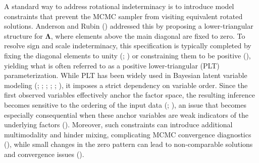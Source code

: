 \documentclass[
  man,
  longtable,
  nolmodern,
  notxfonts,
  notimes,
  colorlinks=true,linkcolor=blue,citecolor=blue,urlcolor=blue]{apa7}
\theoremstyle{plain}
\theoremstyle{plain}
\theoremstyle{remark}
\begin{document}
A standard way to address rotational indeterminacy is to introduce model
constraints that prevent the MCMC sampler from visiting equivalent
rotated solutions. Anderson and Rubin
() addressed this by
proposing a lower-triangular structure for \(\mathbf{\Lambda}\), where
elements above the main diagonal are fixed to zero. To resolve sign and
scale indeterminacy, this specification is typically completed by fixing
the diagonal elements to unity
(;
) or
constraining them to be positive
(), yielding
what is often referred to as a positive lower-triangular (PLT)
parameterization. While PLT has been widely used in Bayesian latent
variable modeling (; ;
;
;
;
), it imposes a
strict dependency on variable order. Since the first observed variables
effectively anchor the factor space, the resulting inference becomes
sensitive to the ordering of the input data
(;
), an issue that
becomes especially consequential when these anchor variables are weak
indicators of the underlying factors
(). Moreover, such
constraints can introduce additional multimodality and hinder mixing,
complicating MCMC convergence diagnostics
(), while
small changes in the zero pattern can lead to non-comparable solutions
and convergence issues ().
\end{document}
